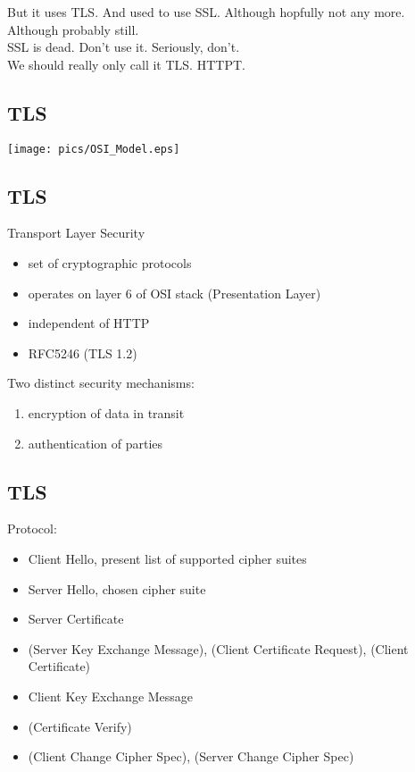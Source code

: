 \documentclass[xga]{xdvislides}
\begin{document}
But it uses TLS.  And used to use SSL. Although
hopfully not any more.  Although probably still. \\

SSL is dead.  Don't use it.  Seriously, don't. \\

We should really only call it TLS.  HTTPT.

\subsection{TLS}
\begin{center}
	\texttt{[image: pics/OSI\_Model.eps]}
\end{center}

\subsection{TLS}
Transport Layer Security
\begin{itemize}
	\item set of cryptographic protocols
	\item operates on layer 6 of OSI stack (Presentation Layer)
	\item independent of HTTP
	\item RFC5246 (TLS 1.2)
\end{itemize}
\addvspace{.5in}
Two distinct security mechanisms:
\begin{enumerate}
	\item encryption of data in transit
	\item authentication of parties
\end{enumerate}

\subsection{TLS}
Protocol:
\begin{itemize}
	\item Client Hello, present list of supported cipher suites
	\item Server Hello, chosen cipher suite
	\item Server Certificate
	\item (Server Key Exchange Message), (Client Certificate Request), (Client Certificate)
	\item Client Key Exchange Message
	\item (Certificate Verify)
	\item (Client Change Cipher Spec), (Server Change Cipher Spec)
\end{itemize}
\end{document}
